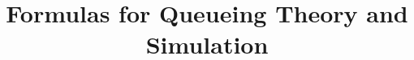 \documentclass[a4paper,11pt]{scrbook}
\title{Formulas for Queueing Theory and Simulation}
\newif\ifFilterExercises
\begin{document}
\maketitle

\tableofcontents

\ifFilterExercises
\Opensolutionfile{exercises}
\fi


%
%


%
%
%
%

%
%
%
%
% 
%
%
%
% 
%
%
%
%
%
%
%
%
%
%
%
%

\begin{comment}



















%
 

 










\end{comment}

\ifFilterExercises
\Closesolutionfile{exercises}
\fi


\cleardoublepage
{}
{}
\printindex

% 
% 
\end{document}
